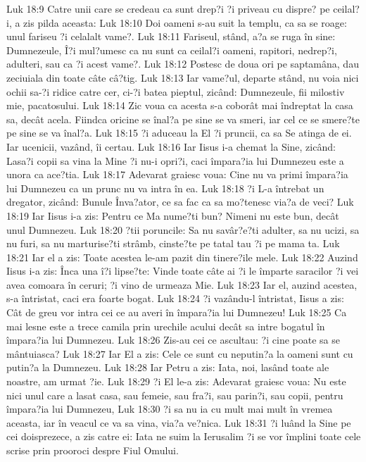Luk 18:9  Catre unii care se credeau ca sunt drep?i ?i priveau cu dispre? pe ceilal?i, a zis pilda aceasta:
Luk 18:10  Doi oameni s-au suit la templu, ca sa se roage: unul fariseu ?i celalalt vame?.
Luk 18:11  Fariseul, stând, a?a se ruga în sine: Dumnezeule, Î?i mul?umesc ca nu sunt ca ceilal?i oameni, rapitori, nedrep?i, adulteri, sau ca ?i acest vame?.
Luk 18:12  Postesc de doua ori pe saptamâna, dau zeciuiala din toate câte câ?tig.
Luk 18:13  Iar vame?ul, departe stând, nu voia nici ochii sa-?i ridice catre cer, ci-?i batea pieptul, zicând: Dumnezeule, fii milostiv mie, pacatosului.
Luk 18:14  Zic voua ca acesta s-a coborât mai îndreptat la casa sa, decât acela. Fiindca oricine se înal?a pe sine se va smeri, iar cel ce se smere?te pe sine se va înal?a.
Luk 18:15  ?i aduceau la El ?i pruncii, ca sa Se atinga de ei. Iar ucenicii, vazând, îi certau.
Luk 18:16  Iar Iisus i-a chemat la Sine, zicând: Lasa?i copii sa vina la Mine ?i nu-i opri?i, caci împara?ia lui Dumnezeu este a unora ca ace?tia.
Luk 18:17  Adevarat graiesc voua: Cine nu va primi împara?ia lui Dumnezeu ca un prunc nu va intra în ea.
Luk 18:18  ?i L-a întrebat un dregator, zicând: Bunule Înva?ator, ce sa fac ca sa mo?tenesc via?a de veci?
Luk 18:19  Iar Iisus i-a zis: Pentru ce Ma nume?ti bun? Nimeni nu este bun, decât unul Dumnezeu.
Luk 18:20  ?tii poruncile: Sa nu savâr?e?ti adulter, sa nu ucizi, sa nu furi, sa nu marturise?ti strâmb, cinste?te pe tatal tau ?i pe mama ta.
Luk 18:21  Iar el a zis: Toate acestea le-am pazit din tinere?ile mele.
Luk 18:22  Auzind Iisus i-a zis: Înca una î?i lipse?te: Vinde toate câte ai ?i le împarte saracilor ?i vei avea comoara în ceruri; ?i vino de urmeaza Mie.
Luk 18:23  Iar el, auzind acestea, s-a întristat, caci era foarte bogat.
Luk 18:24  ?i vazându-l întristat, Iisus a zis: Cât de greu vor intra cei ce au averi în împara?ia lui Dumnezeu!
Luk 18:25  Ca mai lesne este a trece camila prin urechile acului decât sa intre bogatul în împara?ia lui Dumnezeu.
Luk 18:26  Zis-au cei ce ascultau: ?i cine poate sa se mântuiasca?
Luk 18:27  Iar El a zis: Cele ce sunt cu neputin?a la oameni sunt cu putin?a la Dumnezeu.
Luk 18:28  Iar Petru a zis: Iata, noi, lasând toate ale noastre, am urmat ?ie.
Luk 18:29  ?i El le-a zis: Adevarat graiesc voua: Nu este nici unul care a lasat casa, sau femeie, sau fra?i, sau parin?i, sau copii, pentru împara?ia lui Dumnezeu,
Luk 18:30  ?i sa nu ia cu mult mai mult în vremea aceasta, iar în veacul ce va sa vina, via?a ve?nica.
Luk 18:31  ?i luând la Sine pe cei doisprezece, a zis catre ei: Iata ne suim la Ierusalim ?i se vor împlini toate cele scrise prin prooroci despre Fiul Omului.
